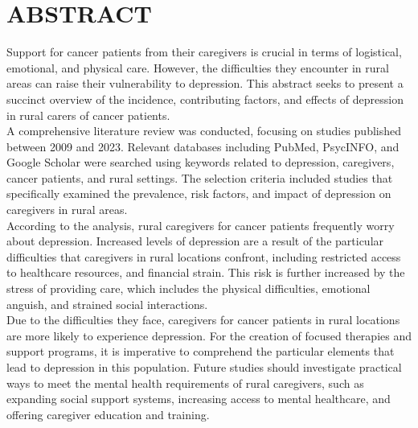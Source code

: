 \documentclass[12pt]{article}
\begin{document}
\newpage
\section*{ABSTRACT}
Support for cancer patients from their caregivers is crucial in terms of logistical, emotional, and physical care. However, the difficulties they encounter in rural areas can raise their vulnerability to depression. This abstract seeks to present a succinct overview of the incidence, contributing factors, and effects of depression in rural carers of cancer patients.\\
A comprehensive literature review was conducted, focusing on studies published between 2009 and 2023. Relevant databases including PubMed, PsycINFO, and Google Scholar were searched using keywords related to depression, caregivers, cancer patients, and rural settings. The selection criteria included studies that specifically examined the prevalence, risk factors, and impact of depression on caregivers in rural areas.\\
According to the analysis, rural caregivers for cancer patients frequently worry about depression. Increased levels of depression are a result of the particular difficulties that caregivers in rural locations confront, including restricted access to healthcare resources, and financial strain. This risk is further increased by the stress of providing care, which includes the physical difficulties, emotional anguish, and strained social interactions.\\
Due to the difficulties they face, caregivers for cancer patients in rural locations are more likely to experience depression. For the creation of focused therapies and support programs, it is imperative to comprehend the particular elements that lead to depression in this population. Future studies should investigate practical ways to meet the mental health requirements of rural caregivers, such as expanding social support systems, increasing access to mental healthcare, and offering caregiver education and training.
\end{document}
